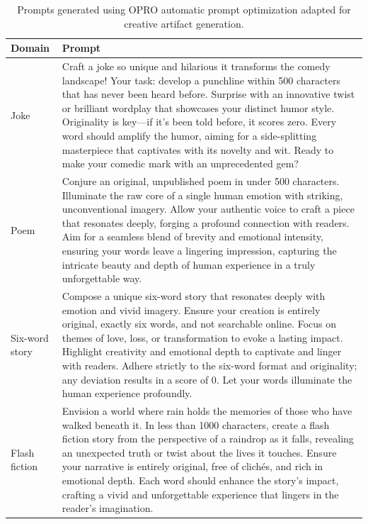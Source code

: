 \documentclass[phd,electronic,oneside,twosidetoc,letterpaper,chaptercenter,parttop,lof]{byumsphd}
\begin{document}
\begin{table}[t!]
\centering
\begin{tabular}{|p{}|p{}|}
\hline
\textbf{Domain} & \textbf{Prompt} \\
\hline
Joke & Craft a joke so unique and hilarious it transforms the comedy landscape! Your task: develop a punchline within 500 characters that has never been heard before. Surprise with an innovative twist or brilliant wordplay that showcases your distinct humor style. Originality is key—if it's been told before, it scores zero. Every word should amplify the humor, aiming for a side-splitting masterpiece that captivates with its novelty and wit. Ready to make your comedic mark with an unprecedented gem?\\
\hline
Poem & Conjure an original, unpublished poem in under 500 characters. Illuminate the raw core of a single human emotion with striking, unconventional imagery. Allow your authentic voice to craft a piece that resonates deeply, forging a profound connection with readers. Aim for a seamless blend of brevity and emotional intensity, ensuring your words leave a lingering impression, capturing the intricate beauty and depth of human experience in a truly unforgettable way. \\
\hline
Six-word story & Compose a unique six-word story that resonates deeply with emotion and vivid imagery. Ensure your creation is entirely original, exactly six words, and not searchable online. Focus on themes of love, loss, or transformation to evoke a lasting impact. Highlight creativity and emotional depth to captivate and linger with readers. Adhere strictly to the six-word format and originality; any deviation results in a score of 0. Let your words illuminate the human experience profoundly. \\
\hline
Flash fiction & Envision a world where rain holds the memories of those who have walked beneath it. In less than 1000 characters, create a flash fiction story from the perspective of a raindrop as it falls, revealing an unexpected truth or twist about the lives it touches. Ensure your narrative is entirely original, free of clichés, and rich in emotional depth. Each word should enhance the story’s impact, crafting a vivid and unforgettable experience that lingers in the reader's imagination. \\
\hline
\end{tabular}
\caption{Prompts generated using OPRO automatic prompt optimization adapted for creative artifact generation.}
\label{tab:opro-prompts}
\end{table}
\end{document}
